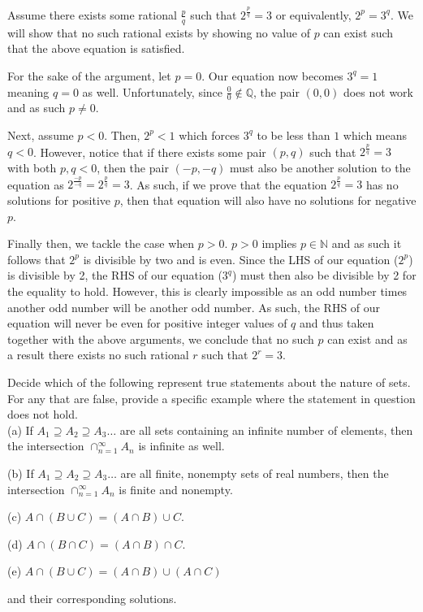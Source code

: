 \documentclass[../analysis_notes.tex]{subfiles}
\begin{document}
\begin{solution}
    Assume there exists some rational $\frac{p}{q}$ such that $2^{\frac{p}{q}} = 3$ or equivalently, $2^p = 3^q$. We will show that no such rational exists by showing no value of $p$ can exist such that the above equation is satisfied.

    For the sake of the argument, let $p = 0$. Our equation now becomes $3^q = 1$ meaning $q = 0$ as well. Unfortunately, since $\frac{0}{0} \not \in \mathbb{Q}$, the pair $(0, 0)$ does not work and as such $p \not = 0$.

    Next, assume $p < 0$. Then, $2^p < 1$ which forces $3^q$ to be less than $1$ which means $q < 0$. However, notice that if there exists some pair $(p, q)$ such that $2^{\frac{p}{q}} = 3$ with both $p, q < 0$, then the pair $(-p, -q)$ must also be another solution to the equation as $2^{\frac{-p}{-q}} = 2^{\frac{p}{q}} = 3$. As such, if we prove that the equation $2^{\frac{p}{q}} = 3$ has no solutions for positive $p$, then that equation will also have no solutions for negative $p$.

    Finally then, we tackle the case when $p > 0$. $p > 0$ implies $p \in \mathbb{N}$ and as such it follows that $2^p$ is divisible by two and is even. Since the LHS of our equation ($2^p$) is divisible by 2, the RHS of our equation ($3^q$) must then also be divisible by 2 for the equality to hold. However, this is clearly impossible as an odd number times another odd number will be another odd number. As such, the RHS of our equation will never be even for positive integer values of $q$ and thus taken together with the above arguments, we conclude that no such $p$ can exist and as a result there exists no such rational $r$ such that $2^r = 3$.
\end{solution}




\begin{exercise}
    Decide which of the following represent true statements about the nature of sets. For any that are false, provide a specific example where the statement in question does not hold. \\

    (a) If \( A_{1} \supseteq A_{2} \supseteq A_3 \dots \) are all sets containing an infinite number of elements, then the intersection $\cap_{n = 1}^{\infty} A_n$ is infinite as well.

    (b) If \( A_{1} \supseteq A_{2} \supseteq A_3 \dots \) are all finite, nonempty sets of real numbers, then the intersection $\cap_{n = 1}^{\infty} A_n$ is finite and nonempty.

    (c) $A \cap (B \cup C) = (A \cap B) \cup C$. 

    (d) $A \cap (B \cap C) = (A \cap B) \cap C$.

    (e) $A \cap (B \cup C) = (A \cap B) \cup (A \cap C)$

\end{exercise}

\begin{solution}
    and their corresponding solutions.
\end{solution}
\end{document}
